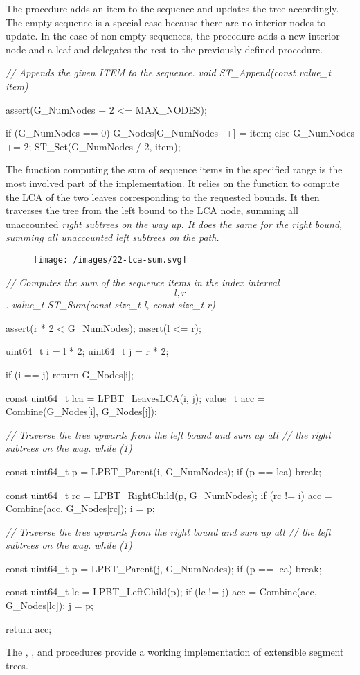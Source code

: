 \documentclass{article}
\begin{document}
The  procedure adds an item to the sequence and updates the tree accordingly.
The empty sequence is a special case because there are no interior nodes to update.
In the case of non-empty sequences, the procedure adds a new interior node and a leaf and delegates the rest to the previously defined  procedure.

\begin{code}[c]
\em{// Appends the given ITEM to the sequence.}
void ST_Append(const value_t item) {
    assert(G_NumNodes + 2 <= MAX_NODES);

    if (G_NumNodes == 0) {
        G_Nodes[G_NumNodes++] = item;
    } else {
        G_NumNodes += 2;
        ST_Set(G_NumNodes / 2, item);
    }
}
\end{code}

The  function computing the sum of sequence items in the specified range is the most involved part of the implementation.
It relies on the  function to compute the LCA of the two leaves corresponding to the requested bounds.
It then traverses the tree from the left bound to the LCA node, summing all unaccounted \em{right} subtrees on the way up.
It does the same for the right bound, summing all unaccounted \em{left} subtrees on the path.

\begin{figure}[grayscale-diagram]
  \texttt{[image: /images/22-lca-sum.svg]}
\end{figure}

\begin{code}[c]
\em{// Computes the sum of the sequence items in the index interval \[l, r\].}
value_t ST_Sum(const size_t l, const size_t r) {
    assert(r * 2 < G_NumNodes);
    assert(l <= r);

    uint64_t i = l * 2;
    uint64_t j = r * 2;

    if (i == j) return G_Nodes[i];

    const uint64_t lca = LPBT_LeavesLCA(i, j);
    value_t acc = Combine(G_Nodes[i], G_Nodes[j]);

    \em{// Traverse the tree upwards from the left bound and sum up all}
    \em{// the right subtrees on the way.}
    while (1) {
        const uint64_t p = LPBT_Parent(i, G_NumNodes);
        if (p == lca) break;

        const uint64_t rc = LPBT_RightChild(p, G_NumNodes);
        if (rc != i) acc = Combine(acc, G_Nodes[rc]);
        i = p;
    }
    \em{// Traverse the tree upwards from the right bound and sum up all}
    \em{// the left subtrees on the way.}
    while (1) {
        const uint64_t p = LPBT_Parent(j, G_NumNodes);
        if (p == lca) break;

        const uint64_t lc = LPBT_LeftChild(p);
        if (lc != j) acc = Combine(acc, G_Nodes[lc]);
        j = p;
    }
    return acc;
}
\end{code}

The , , and  procedures provide a working implementation of extensible segment trees.
\end{document}
